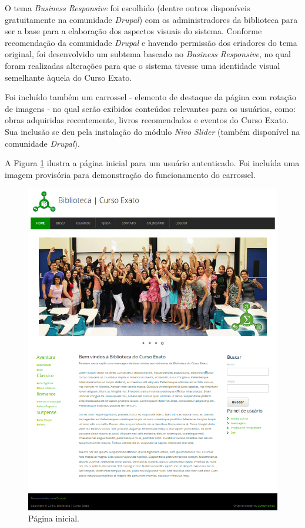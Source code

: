 \documentclass[a4paper]{article}
\begin{document}
O tema \textit{Business Responsive} foi escolhido (dentre outros disponíveis gratuitamente na comunidade \textit{Drupal}) com os administradores da biblioteca para ser a base para a elaboração dos aspectos visuais do sistema. Conforme recomendação da comunidade \textit{Drupal} e havendo permissão dos criadores do tema original, foi desenvolvido um subtema baseado no \textit{Business Responsive}, no qual foram realizadas alterações para que o sistema tivesse uma identidade visual semelhante àquela do Curso Exato.

Foi incluído também um carrossel - elemento de destaque da página com rotação de imagens - no qual serão exibidos conteúdos relevantes para os usuários, como: obras adquiridas recentemente, livros recomendados e eventos do Curso Exato. Sua inclusão se deu pela instalação do módulo \textit{Nivo Slider} (também disponível na comunidade \textit{Drupal}).

A Figura \ref{home} ilustra a página inicial para um usuário autenticado. Foi incluída uma imagem provisória para demonstração do funcionamento do carrossel.

\begin{figure}[pbth!]
\centering
\includegraphics[width=140mm]{img/home-small.png}
\caption{Página inicial.\label{home}}
\end{figure}
\end{document}
